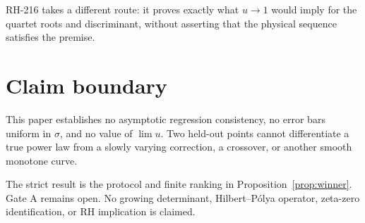\documentclass[12pt]{article}
\theoremstyle{remark}\newtheorem{remark}[theorem]{Remark}
\begin{document}
RH-216 takes a different route: it proves exactly what $u\to1$ would imply
for the quartet roots and discriminant, without asserting that the physical
sequence satisfies the premise.

\section{Claim boundary}

This paper establishes no asymptotic regression consistency, no error bars
uniform in $\sigma$, and no value of $\lim u$.  Two held-out points cannot
differentiate a true power law from a slowly varying correction, a crossover,
or another smooth monotone curve.

The strict result is the protocol and finite ranking in
Proposition~\ref{prop:winner}.  Gate A remains open.  No growing determinant,
Hilbert--P\'olya operator, zeta-zero identification, or RH implication is
claimed.


\end{document}
